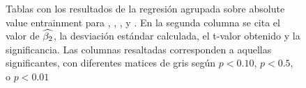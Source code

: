 \begin{figure}
\caption{Tablas con los resultados de la regresión agrupada sobre absolute value entrainment para \NOISETOHARMONICS, \SYLAVG, \PHONAVG, \LOCALSHIMMER y \LOCALJITTER. En la segunda columna se cita el valor de $\widehat{\beta_2}$, la desviación estándar calculada, el t-valor obtenido y la significancia. Las columnas resaltadas corresponden a aquellas significantes, con diferentes matices de gris según $p < 0.10$, $p < 0.5$, o $p < 0.01$}

\label{fig:pooled_abs_entrainment_2}

\end{figure}
